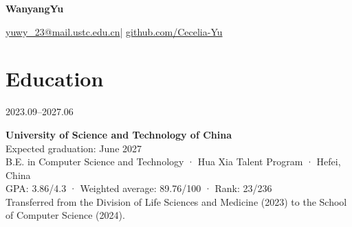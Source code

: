 \documentclass[10pt,a4paper]{article}
\newcommand{\entry}[2]{\noindent\begin{minipage}[t]{.19\linewidth}\small #1\end{minipage}\hfill\begin{minipage}[t]{.79\linewidth}#2\end{minipage}\par\vspace{7pt}}
\begin{document}
{\LARGE\bfseries WanyangYu}\par
\href{mailto:yuwy_23@mail.ustc.edu.cn}{yuwy\_23@mail.ustc.edu.cn}\quad | \quad
\href{https://github.com/Cecelia-Yu}{github.com/Cecelia-Yu}
\section*{Education}

\entry{2023.09--2027.06}{\textbf{University of Science and Technology of China}\\
Expected graduation: June 2027\\
B.E. in Computer Science and Technology · Hua Xia Talent Program · Hefei, China\\
GPA: 3.86/4.3 · Weighted average: 89.76/100 · Rank: 23/236\\
Transferred from the Division of Life Sciences and Medicine (2023) to the School of Computer Science (2024).}
\end{document}
